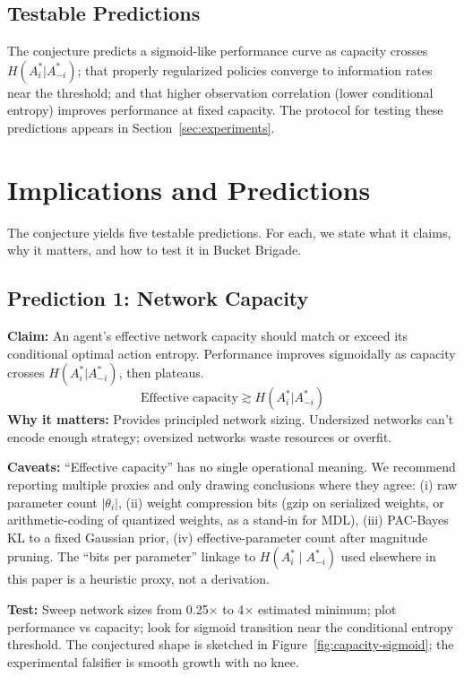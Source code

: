 \documentclass[10pt, letterpaper]{article}
\begin{document}
\subsection{Testable Predictions}

The conjecture predicts a sigmoid-like performance curve as capacity crosses $H(A_i^*|A_{-i}^*)$; that properly regularized policies converge to information rates near the threshold; and that higher observation correlation (lower conditional entropy) improves performance at fixed capacity. The protocol for testing these predictions appears in Section~\ref{sec:experiments}.

\section{Implications and Predictions}
\label{sec:implications}

The conjecture yields five testable predictions. For each, we state what it claims, why it matters, and how to test it in Bucket Brigade.

\subsection{Prediction 1: Network Capacity}
\label{pred:capacity}

\textbf{Claim:} An agent's effective network capacity should match or exceed its conditional optimal action entropy. Performance improves sigmoidally as capacity crosses $H(A_i^*|A_{-i}^*)$, then plateaus.
\[\text{Effective capacity} \gtrsim H(A_i^*|A_{-i}^*)\]
\textbf{Why it matters:} Provides principled network sizing. Undersized networks can't encode enough strategy; oversized networks waste resources or overfit.

\textbf{Caveats:} ``Effective capacity'' has no single operational meaning. We recommend reporting multiple proxies and only drawing conclusions where they agree: (i) raw parameter count $|\theta_i|$, (ii) weight compression bits (gzip on serialized weights, or arithmetic-coding of quantized weights, as a stand-in for MDL), (iii) PAC-Bayes KL to a fixed Gaussian prior, (iv) effective-parameter count after magnitude pruning. The ``bits per parameter'' linkage to $H(A_i^* \mid A_{-i}^*)$ used elsewhere in this paper is a heuristic proxy, not a derivation.

\textbf{Test:} Sweep network sizes from 0.25$\times$ to 4$\times$ estimated minimum; plot performance vs capacity; look for sigmoid transition near the conditional entropy threshold. The conjectured shape is sketched in Figure~\ref{fig:capacity-sigmoid}; the experimental falsifier is smooth growth with no knee.
\end{document}

